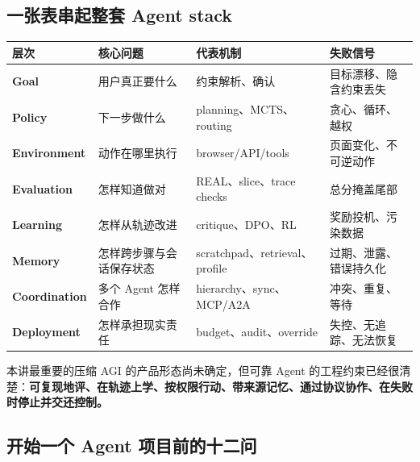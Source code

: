 \documentclass[a4paper]{article}
\begin{document}
\subsection{一张表串起整套 Agent stack}

\begin{center}
\begin{tabularx}{\textwidth}{>{\bfseries}p{} X X X}
层次 & 核心问题 & 代表机制 & 失败信号 \\
\hline
Goal & 用户真正要什么 & 约束解析、确认 & 目标漂移、隐含约束丢失 \\
Policy & 下一步做什么 & planning、MCTS、routing & 贪心、循环、越权 \\
Environment & 动作在哪里执行 & browser/API/tools & 页面变化、不可逆动作 \\
Evaluation & 怎样知道做对 & REAL、slice、trace checks & 总分掩盖尾部 \\
Learning & 怎样从轨迹改进 & critique、DPO、RL & 奖励投机、污染数据 \\
Memory & 怎样跨步骤与会话保存状态 & scratchpad、retrieval、profile & 过期、泄露、错误持久化 \\
Coordination & 多个 Agent 怎样合作 & hierarchy、sync、MCP/A2A & 冲突、重复、等待 \\
Deployment & 怎样承担现实责任 & budget、audit、override & 失控、无追踪、无法恢复 \\
\end{tabularx}
\end{center}

\begin{importantbox}{本讲最重要的压缩}
AGI 的产品形态尚未确定，但可靠 Agent 的工程约束已经很清楚：\textbf{可复现地评、在轨迹上学、按权限行动、带来源记忆、通过协议协作、在失败时停止并交还控制。}
\end{importantbox}

\subsection{开始一个 Agent 项目前的十二问}
\end{document}
